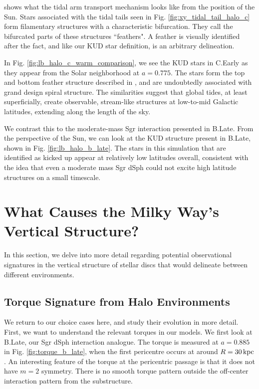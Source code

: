 \citet{laporte_2019_feathers} shows what the tidal arm transport mechanism looks like from the position of the Sun. Stars associated with the tidal tails seen in Fig. \ref{fig:xy_tidal_tail_halo_c} form filamentary structures with a characteristic bifurcation. They call the bifurcated parts of these structures ``feathers". A feather is visually identified after the fact, and like our KUD star definition, is an arbitrary delineation.

In  Fig. \ref{fig:lb_halo_c_warm_comparison}, we see the KUD stars in C.Early as they appear from the Solar neighborhood at $a=0.775$. The stars form the top and bottom feather structure described in \citet{laporte_2019_feathers}, and are undoubtedly associated with grand design spiral structure. The similarities suggest that global tides, at least superficially, create observable, stream-like structures at low-to-mid Galactic latitudes, extending along the length of the sky.


We contrast this to the moderate-mass Sgr interaction presented in B.Late. From the perspective of the Sun, we can look at the KUD structure present in B.Late, shown in Fig. \ref{fig:lb_halo_b_late}. The stars in this simulation that are identified as kicked up appear at relatively low latitudes overall, consistent with the idea that even a moderate mass Sgr dSph could not excite high latitude structures on a small timescale. 




\section{What Causes the Milky Way's Vertical Structure?} \label{sec:disentangle}

In this section, we delve into more detail regarding potential observational signatures in the vertical structure of stellar discs that would delineate between different environments. 





\subsection{Torque Signature from Halo Environments} \label{ssec:torque_signature}


We return to our choice cases here, and study their evolution in more detail. First, we want to understand the relevant torques in our models. We first look at B.Late, our Sgr dSph interaction analogue. The torque is measured at $a=0.885$ in Fig. \ref{fig:torque_b_late}, when the first pericentre occurs at around $R = 30 \,\text{kpc}$. An interesting feature of the torque at the pericentric passage is that it does not have $m=2$ symmetry. There is no smooth torque pattern outside the off-center interaction pattern from the substructure.

